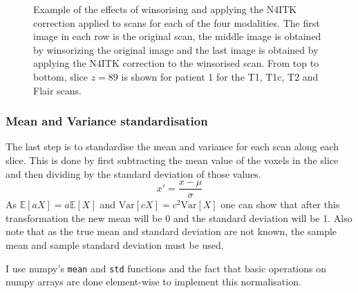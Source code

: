 \documentclass[12pt,a4paper,twoside,openright]{report}
\begin{document}
\begin{figure}
	\caption{Example of the effects of winsorising and applying the N4ITK correction applied to scans for each of the four modalities. The first image in each row is the original scan, the middle image is obtained by winsorizing the original image and the last image is obtained by applying the N4ITK correction to the winsorised scan. From top to bottom, slice $z=89$ is shown for patient 1 for the T1, T1c, T2 and Flair scans.}
\end{figure}

\subsubsection{Mean and Variance standardisation}
The last step is to standardise the mean and variance for each scan along each slice. This is done by first subtracting the mean value of the voxels in the slice and then dividing by the standard deviation of those values. 
\begin{equation}
	x' = \frac{x - \mu}{\sigma}
\end{equation}
As $\mathbb{E}[aX] = a \mathbb{E}[X]$ and $\textrm{Var} [cX] = c^2 \textrm{Var} [X]$ one can show that after this transformation the new mean will be 0 and the standard deviation will be 1. Also note that as the true mean and standard deviation are not known, the sample mean and sample standard deviation must be used. 

I use numpy's \texttt{mean} and \texttt{std} functions and the fact that basic operations on numpy arrays are done element-wise to implement this normalisation.
\end{document}
